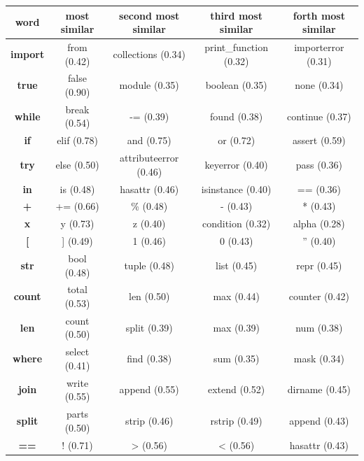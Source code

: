 \documentclass[
a4paper,
pagesize,
pdftex,
12pt,
ngerman,
fleqn,
final,
]{scrartcl}
\begin{document}
	\footnotesize
	\begin{center}
		\begin{tabular}{ |c|c|c|c|c| } 
			\hline
			\textbf{word} & \textbf{ most similar} &\textbf{ second most similar} & \textbf{third most similar}& \textbf{forth most similar}\\ 
			\hline
			\textbf{import} & from (0.42) & collections (0.34) & print\_function (0.32) & importerror (0.31)\\ 
			\textbf{true} & false (0.90) & module (0.35) & boolean (0.35) & none (0.34)\\  
			\textbf{while} & break (0.54)  & -= (0.39) & found (0.38) & continue (0.37) \\
			\textbf{if} & elif (0.78)  & and (0.75) & or (0.72) & assert (0.59) \\
			\textbf{try} & else (0.50)  & attributeerror (0.46) & keyerror (0.40) & pass (0.36) \\
			\textbf{in} & is (0.48)  & hasattr (0.46) & isinstance (0.40) & == (0.36) \\
			\textbf{+} & += (0.66)  & \% (0.48) & - (0.43) & * (0.43) \\
			\textbf{x} & y (0.73)  & z (0.40) & condition (0.32) & alpha (0.28) \\
			\textbf{[} & ] (0.49)  & 1 (0.46) & 0 (0.43) & '' (0.40) \\
			\textbf{str} & bool (0.48)  & tuple (0.48) & list (0.45) & repr (0.45) \\
			\textbf{count} & total (0.53)  & len (0.50) & max (0.44) & counter (0.42) \\
			\textbf{len} & count (0.50)  & split (0.39) & max (0.39) & num (0.38) \\
			\textbf{where} & select (0.41)  & find (0.38) & sum (0.35) & mask (0.34) \\
			\textbf{join} & write (0.55)  & append (0.55) & extend (0.52) & dirname (0.45) \\
			\textbf{split} & parts (0.50)  & strip (0.46) & rstrip (0.49) & append (0.43) \\
			\textbf{==} & ! (0.71)  & > (0.56) & < (0.56) & hasattr (0.43) \\
			\hline
		\end{tabular}
	\end{center}
	\normalsize
	
\end{document}
